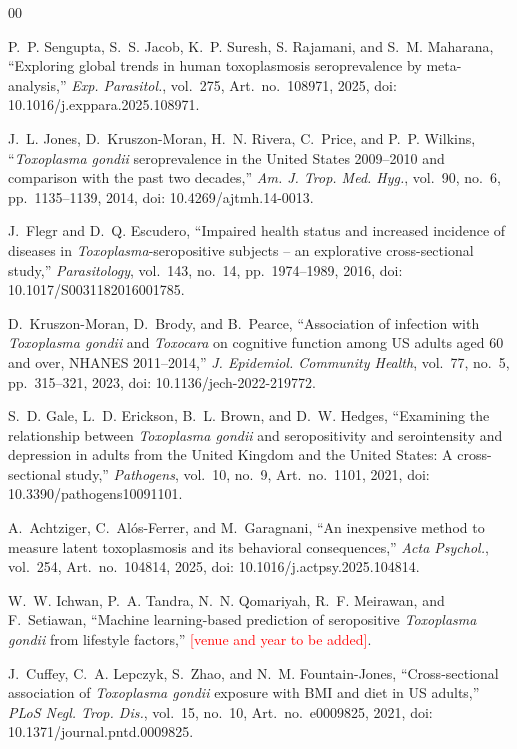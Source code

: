 \documentclass[conference]{IEEEtran}
\begin{document}
\begin{thebibliography}{00}

 P.~P. Sengupta, S.~S. Jacob, K.~P. Suresh, S. Rajamani, and S.~M. Maharana, ``Exploring global trends in human toxoplasmosis seroprevalence by meta-analysis,'' \textit{Exp. Parasitol.}, vol.~275, Art.~no.~108971, 2025, doi: 10.1016/j.exppara.2025.108971.

 J.~L. Jones, D.~Kruszon-Moran, H.~N. Rivera, C.~Price, and P.~P. Wilkins, ``\textit{Toxoplasma gondii} seroprevalence in the United States 2009--2010 and comparison with the past two decades,'' \textit{Am. J. Trop. Med. Hyg.}, vol.~90, no.~6, pp.~1135--1139, 2014, doi: 10.4269/ajtmh.14-0013.

 J.~Flegr and D.~Q. Escudero, ``Impaired health status and increased incidence of diseases in \textit{Toxoplasma}-seropositive subjects -- an explorative cross-sectional study,'' \textit{Parasitology}, vol.~143, no.~14, pp.~1974--1989, 2016, doi: 10.1017/S0031182016001785.

 D.~Kruszon-Moran, D.~Brody, and B.~Pearce, ``Association of infection with \textit{Toxoplasma gondii} and \textit{Toxocara} on cognitive function among US adults aged 60 and over, NHANES 2011--2014,'' \textit{J. Epidemiol. Community Health}, vol.~77, no.~5, pp.~315--321, 2023, doi: 10.1136/jech-2022-219772.

 S.~D. Gale, L.~D. Erickson, B.~L. Brown, and D.~W. Hedges, ``Examining the relationship between \textit{Toxoplasma gondii} and seropositivity and serointensity and depression in adults from the United Kingdom and the United States: A cross-sectional study,'' \textit{Pathogens}, vol.~10, no.~9, Art.~no.~1101, 2021, doi: 10.3390/pathogens10091101.

 A.~Achtziger, C.~Al\'{o}s-Ferrer, and M.~Garagnani, ``An inexpensive method to measure latent toxoplasmosis and its behavioral consequences,'' \textit{Acta Psychol.}, vol.~254, Art.~no.~104814, 2025, doi: 10.1016/j.actpsy.2025.104814.

 W.~W. Ichwan, P.~A. Tandra, N.~N. Qomariyah, R.~F. Meirawan, and F.~Setiawan, ``Machine learning-based prediction of seropositive \textit{Toxoplasma gondii} from lifestyle factors,'' \textcolor{red}{[venue and year to be added]}.

 J.~Cuffey, C.~A. Lepczyk, S.~Zhao, and N.~M. Fountain-Jones, ``Cross-sectional association of \textit{Toxoplasma gondii} exposure with BMI and diet in US adults,'' \textit{PLoS Negl. Trop. Dis.}, vol.~15, no.~10, Art.~no.~e0009825, 2021, doi: 10.1371/journal.pntd.0009825.


\end{thebibliography}
\end{document}
